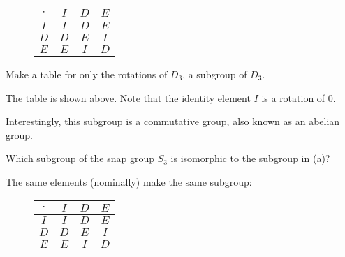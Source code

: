 \documentclass[../key.tex]{subfiles}
\begin{document}
\begin{figure}[h]
	\begin{center}
		\begin{minipage}[b]{\textwidth}
			\centering
			\begin{tabular}{c|ccc}
				\hline
				$\cdot$ & $I$ & $D$ & $E$ \\ \hline
				\rowcolor{light-gray}
				$I$ & $I$ & $D$ & $E$ \\
				$D$ & $D$ & $E$ & $I$ \\
				\rowcolor{light-gray}
				$E$ & $E$ & $I$ & $D$ \\ \hline
			\end{tabular}
			\vspace*{0.5\baselineskip}
		\end{minipage}
	\end{center}
	\vspace*{-2\baselineskip}
\end{figure}

\begin{outer_problem}
\item
\begin{inner_problem}[start=1,leftmargin=25pt]
	\item Make a table for only the rotations of $D_3$, a subgroup of $D_3$.
\end{inner_problem}
\end{outer_problem}

\noindent The table is shown above. Note that the identity element $I$ is a rotation of $0$.

Interestingly, this subgroup is a commutative group, also known as an abelian group.

\begin{inner_problem}
\item Which subgroup of the snap group $S_3$ is isomorphic to the subgroup in (a)?
\end{inner_problem}

\noindent The same elements (nominally) make the same subgroup:

\begin{figure}[h]
	\begin{center}
		\begin{minipage}[b]{\textwidth}
			\centering
			\begin{tabular}{c|ccc}
				\hline
				$\cdot$ & $I$ & $D$ & $E$ \\ \hline
				\rowcolor{light-gray}
				$I$ & $I$ & $D$ & $E$ \\
				$D$ & $D$ & $E$ & $I$ \\
				\rowcolor{light-gray}
				$E$ & $E$ & $I$ & $D$ \\ \hline
			\end{tabular}
			\vspace*{0.5\baselineskip}
		\end{minipage}
	\end{center}
	\vspace*{-2\baselineskip}
\end{figure}
\end{document}
